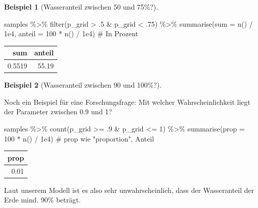 \documentclass[
  a4paper,
  DIV=11]{scrreprt}
\newenvironment{Shaded}{\begin{snugshade}}{\end{snugshade}}
\newcommand{\AttributeTok}[1]{\textcolor[rgb]{0.40,0.45,0.13}{#1}}
\newcommand{\CommentTok}[1]{\textcolor[rgb]{0.37,0.37,0.37}{#1}}
\newcommand{\DecValTok}[1]{\textcolor[rgb]{0.68,0.00,0.00}{#1}}
\newcommand{\FloatTok}[1]{\textcolor[rgb]{0.68,0.00,0.00}{#1}}
\newcommand{\FunctionTok}[1]{\textcolor[rgb]{0.28,0.35,0.67}{#1}}
\newcommand{\NormalTok}[1]{\textcolor[rgb]{0.00,0.23,0.31}{#1}}
\newcommand{\SpecialCharTok}[1]{\textcolor[rgb]{0.37,0.37,0.37}{#1}}
\theoremstyle{definition}
\newtheorem{example}{Beispiel}[chapter]
\theoremstyle{remark}
\begin{document}
\begin{example}[Wasseranteil zwischen 50 und 75\%?]
\begin{Shaded}
\begin{Highlighting}[]
\NormalTok{samples }\SpecialCharTok{\%\textgreater{}\%} 
  \FunctionTok{filter}\NormalTok{(p\_grid }\SpecialCharTok{\textgreater{}}\NormalTok{ .}\DecValTok{5} \SpecialCharTok{\&}\NormalTok{ p\_grid }\SpecialCharTok{\textless{}}\NormalTok{ .}\DecValTok{75}\NormalTok{) }\SpecialCharTok{\%\textgreater{}\%} 
  \FunctionTok{summarise}\NormalTok{(}\AttributeTok{sum     =}       \FunctionTok{n}\NormalTok{() }\SpecialCharTok{/} \FloatTok{1e4}\NormalTok{,}
            \AttributeTok{anteil =} \DecValTok{100} \SpecialCharTok{*} \FunctionTok{n}\NormalTok{() }\SpecialCharTok{/} \FloatTok{1e4}\NormalTok{)  }\CommentTok{\# In Prozent}
\end{Highlighting}
\end{Shaded}

\begin{longtable}[]{@{}rr@{}}
\toprule()
sum & anteil \\
\midrule()
\endhead
0.5519 & 55.19 \\
\bottomrule()
\end{longtable}

\end{example}

\leavevmode{}%
\begin{example}[Wasseranteil zwischen 90 und 100\%?]\label{exm-param3}

Noch ein Beispiel für eine Forschungsfrage: Mit welcher
Wahrscheinlichkeit liegt der Parameter zwischen 0.9 und 1?

\begin{Shaded}
\begin{Highlighting}[]
\NormalTok{samples }\SpecialCharTok{\%\textgreater{}\%} 
  \FunctionTok{count}\NormalTok{(p\_grid }\SpecialCharTok{\textgreater{}=}\NormalTok{ .}\DecValTok{9} \SpecialCharTok{\&}\NormalTok{ p\_grid }\SpecialCharTok{\textless{}=} \DecValTok{1}\NormalTok{) }\SpecialCharTok{\%\textgreater{}\%} 
  \FunctionTok{summarise}\NormalTok{(}\AttributeTok{prop =} \DecValTok{100} \SpecialCharTok{*} \FunctionTok{n}\NormalTok{() }\SpecialCharTok{/} \FloatTok{1e4}\NormalTok{)  }\CommentTok{\# prop wie "proportion", Anteil}
\end{Highlighting}
\end{Shaded}

\begin{longtable}[]{@{}r@{}}
\toprule()
prop \\
\midrule()
\endhead
0.01 \\
\bottomrule()
\end{longtable}

Laut unserem Modell ist es also sehr unwahrscheinlich, dass der
Wasseranteil der Erde mind. 90\% beträgt.

\end{example}
\end{document}
